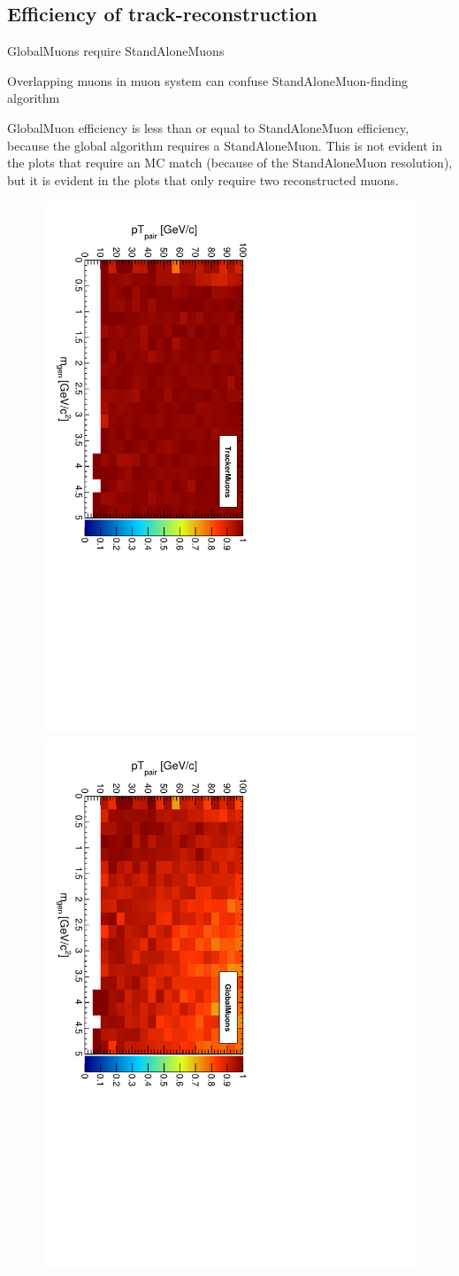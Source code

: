 \documentclass[12pt]{article}
\begin{document}
\subsection{Efficiency of track-reconstruction}

GlobalMuons require StandAloneMuons

Overlapping muons in muon system can confuse StandAloneMuon-finding algorithm

GlobalMuon efficiency is less than or equal to StandAloneMuon
efficiency, because the global algorithm requires a StandAloneMuon.
This is not evident in the plots that require an MC match (because of
the StandAloneMuon resolution), but it is evident in the plots that
only require two reconstructed muons.

\begin{figure}[p]
\includegraphics[height=0.5\linewidth, angle=90]{fig/acceptance_plot/pairptvsmass_TrackerMuons.pdf}
\includegraphics[height=0.5\linewidth, angle=90]{fig/acceptance_plot/pairptvsmass_GlobalMuons.pdf}


\end{figure}
\end{document}
